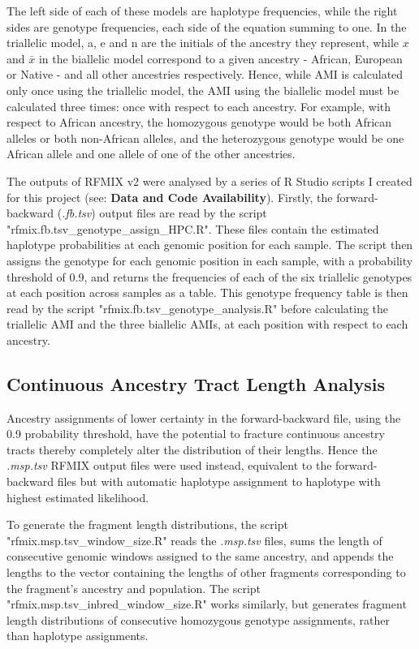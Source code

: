 \documentclass[11pt]{article}
\begin{document}
The left side of each of these models are haplotype frequencies, while the right sides are genotype frequencies, each side of the equation summing to one. In the triallelic model, a, e and n are the initials of the ancestry they represent, while $x$ and $\bar{x}$ in the biallelic model correspond to a given ancestry - African, European or Native - and all other ancestries respectively. Hence, while AMI is calculated only once using the triallelic model, the AMI using the biallelic model must be calculated three times: once with respect to each ancestry. For example, with respect to African ancestry, the homozygous genotype would be both African alleles or both non-African alleles, and the heterozygous genotype would be one African allele and one allele of one of the other ancestries.

The outputs of RFMIX v2 were analysed by a series of R Studio scripts I created for this project (see: \textbf{Data and Code Availability}). Firstly, the forward-backward (\textit{.fb.tsv}) output files are read by the script "rfmix.fb.tsv\_genotype\_assign\_HPC.R". These files contain the estimated haplotype probabilities at each genomic position for each sample. The script then assigns the genotype for each genomic position in each sample, with a probability threshold of 0.9, and returns the frequencies of each of the six triallelic genotypes at each position across samples as a table. This genotype frequency table is then read by the script "rfmix.fb.tsv\_genotype\_analysis.R" before calculating the triallelic AMI and the three biallelic AMIs, at each position with respect to each ancestry.






\subsection{Continuous Ancestry Tract Length Analysis}


Ancestry assignments of lower certainty in the forward-backward file, using the 0.9 probability threshold, have the potential to fracture continuous ancestry tracts thereby completely alter the distribution of their lengths. Hence the \textit{.msp.tsv} RFMIX output files were used instead, equivalent to the forward-backward files but with automatic haplotype assignment to haplotype with highest estimated likelihood.

To generate the fragment length distributions, the script "rfmix.msp.tsv\_window\_size.R" reads the \textit{.msp.tsv} files, sums the length of consecutive genomic windows assigned to the same ancestry, and appends the lengths to the vector containing the lengths of other fragments corresponding to the fragment's ancestry and population. The script "rfmix.msp.tsv\_inbred\_window\_size.R" works similarly, but generates fragment length distributions of consecutive homozygous genotype assignments, rather than haplotype assignments. 
\end{document}

